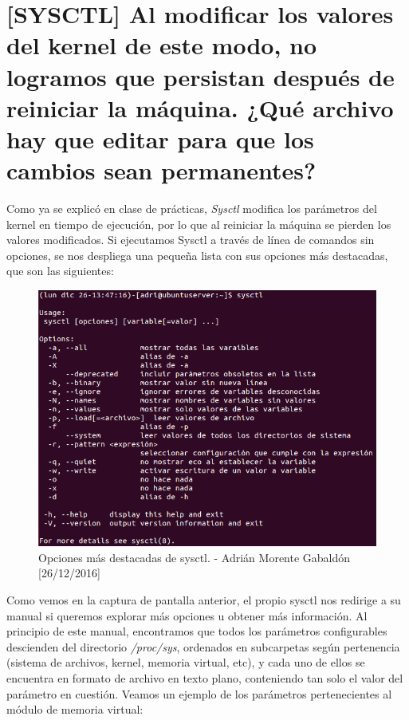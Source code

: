 \section{[SYSCTL] Al modificar los valores del kernel de este modo, no logramos que persistan después de reiniciar
la máquina. ¿Qué archivo hay que editar para que los cambios sean permanentes?}
Como ya se explicó en clase de prácticas, \emph{Sysctl} modifica los parámetros del kernel en tiempo de ejecución,
por lo que al reiniciar la máquina se pierden los valores modificados. Si ejecutamos Sysctl a través de línea de
comandos sin opciones, se nos despliega una pequeña lista con sus opciones más destacadas, que son las siguientes:
\begin{figure}[H]
	\centering
	\includegraphics[scale=0.6]{sysctl-h}
	\caption{Opciones más destacadas de sysctl. - Adrián Morente Gabaldón [26/12/2016]}
	\label{figura1}
\end{figure}
Como vemos en la captura de pantalla anterior, el propio sysctl nos redirige a su manual si queremos explorar más
opciones u obtener más información. Al principio de este manual, encontramos que todos los parámetros configurables
descienden del directorio \emph{/proc/sys}, ordenados en subcarpetas según pertenencia (sistema de archivos, kernel,
memoria virtual, etc), y cada uno de ellos se encuentra en formato de archivo en texto plano, conteniendo tan solo
el valor del parámetro en cuestión. Veamos un ejemplo de los parámetros pertenecientes al módulo de memoria virtual:
